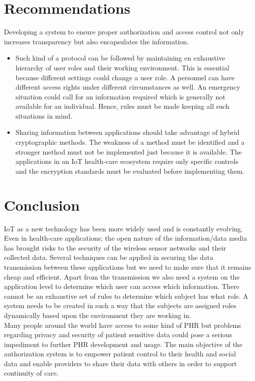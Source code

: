 \documentclass[letterpaper, 10 pt, conference]{ieeeconf}  %
\begin{document}
\section{Recommendations}
Developing a system to ensure proper authorization and access control not only increases transparency but also encapsulates the information. 
\begin{itemize}
\item
Such kind of a protocol can be followed by maintaining en exhaustive hierarchy of user roles and their working environment. This is essential because different settings could change a user role. A personnel can have different access rights under different circumstances as well. An emergency situation could call for an information required which is generally not available for an individual. Hence, rules must be made keeping all such situations in mind.
\item Sharing information between applications should take advantage of hybrid cryptographic methods. The weakness of a method must be identified and a stronger method must not be implemented just because it is available. The applications in an IoT health-care ecosystem require only specific controls and the encryption standards must be evaluated before implementing them.
\end{itemize}

\section{Conclusion}

IoT as a new technology has been more widely used and is constantly evolving. Even in health-care applications; the open nature of the information/data media has brought risks to the security of the wireless sensor networks and their collected data. Several techniques can be applied in securing the data transmission between these applications but we need to make sure that it remains cheap and efficient. Apart from the transmission we also need a system on the application level to determine which user can access which information. There cannot be an exhaustive set of rules to determine which subject has what role. A system needs to be created in such a way that the subjects are assigned roles dynamically based upon the environment they are
working in.\\
\indent Many people around the world have access to some kind of PHR but problems regarding privacy and security of patient sensitive data could pose a serious impediment to further PHR development and usage. The main objective of the authorization system is to empower patient control to their health and social data and enable providers to share their data with others in order to support continuity of care.
\end{document}
